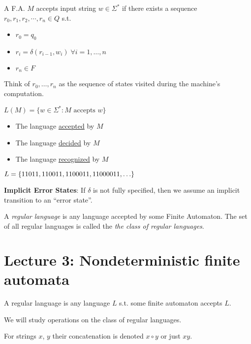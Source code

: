 \begin{definition}
    A F.A. $M$ accepts input string $w \in \Sigma^*$ if there exists a sequence $r_0, r_1, r_2, \cdots, r_n \in Q$ s.t.

    \begin{itemize}
        \item $r_0 = q_0$
        \item $r_i = \delta(r_{i-1}, w_i) \; \forall i = 1, \ldots, n$
        \item $r_n \in F$
    \end{itemize}

    Think of $r_0, \ldots, r_n$ as the sequence of states visited during the machine's computation.

    $L(M) = \{w \in \Sigma^*: M \text{ accepts } w\}$

    \begin{itemize}
        \item The language \underline{accepted} by $M$
        \item The language \underline{decided} by $M$
        \item The language \underline{recognized} by $M$
    \end{itemize}

\end{definition}

$L = \left \{ 11011, 110011, 1100011, 11000011, \ldots \right \}$

\textbf{Implicit Error States}: If $\delta$ is not fully specified, then we assume an implicit transition to an ``error state''.

\begin{definition}
    A \emph{regular language} is any language accepted by some Finite Automaton. The set of all regular languages is called the \emph{the class of regular languages}.
\end{definition}

\section*{Lecture 3: Nondeterministic finite automata}

\begin{definition}
    A regular language is any language $L$ s.t. some finite automaton accepts $L$.
\end{definition}

We will study operations on the class of regular languages.

For strings $x$, $y$ their concatenation is denoted $x \circ y$ or just $xy$.

